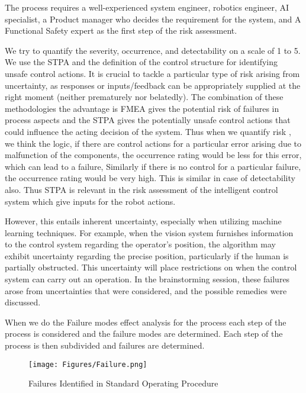 {The process requires a well-experienced system engineer, robotics engineer, AI specialist, a Product manager who decides the requirement for the system, and A Functional Safety expert as the first step of the risk assessment.


We try to quantify the severity, occurrence, and detectability on a scale of 1 to 5. We use the STPA and the definition of the control structure for identifying unsafe control actions.
It is crucial to tackle a particular type of risk arising from uncertainty, as responses or inputs/feedback can be appropriately supplied at the right moment (neither prematurely nor belatedly). The combination of these methodologies the advantage is FMEA gives the potential risk of failures in process aspects and the STPA gives the potentially unsafe control actions that could influence the acting decision of the system. 
Thus when we quantify risk , we think the logic, if there are control actions for a particular error arising due to malfunction of the components, the occurrence rating would be less for this error, which can lead to a failure, Similarly if there is no control for a particular failure, the occurrence rating would be very high. This is similar in case of detectability also. Thus STPA is relevant in the risk assessment of the intelligent control system which give inputs for the robot actions.

 However, this entails inherent uncertainty, especially when utilizing machine learning techniques. For example, when the vision system furnishes information to the control system regarding the operator's position, the algorithm may exhibit uncertainty regarding the precise position, particularly if the human is partially obstructed. This uncertainty will place restrictions on when the control system can carry out an operation. In the brainstorming session, these failures arose from uncertainties that were considered, and the possible remedies were discussed. 
 

\vspace{0.5cm}
\vspace{0.2cm}

When we do the Failure modes effect analysis for the process each step of the process is considered and the failure modes are determined. Each step of the process is then subdivided and failures are determined.

\begin{figure}
    \centering
    \texttt{[image: Figures/Failure.png]}
    \caption{Failures Identified in Standard Operating Procedure}
    \label{fig:enter-label}
\end{figure}

}
